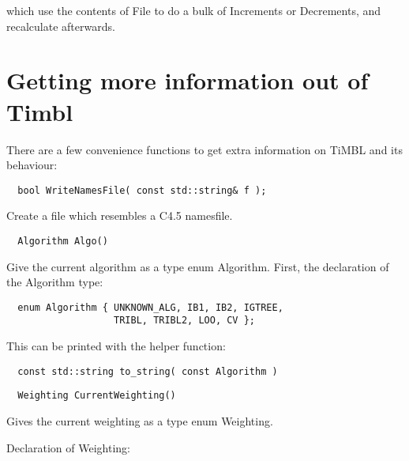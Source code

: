 \documentclass{report}
\begin{document}
which use the contents of File to do a bulk of Increments or Decrements, and
recalculate afterwards.

\section{Getting more information out of Timbl}

There are a few convenience functions to get extra information on
TiMBL and its behaviour:

\begin{footnotesize}
\begin{verbatim}
  bool WriteNamesFile( const std::string& f );
\end{verbatim}
\end{footnotesize}

Create a file which resembles a C4.5 namesfile.

\begin{footnotesize}
\begin{verbatim}
  Algorithm Algo()
\end{verbatim}
\end{footnotesize}

Give the current algorithm as a type enum Algorithm. First, the
declaration of the Algorithm type:

\begin{footnotesize}
\begin{verbatim}
  enum Algorithm { UNKNOWN_ALG, IB1, IB2, IGTREE, 
                   TRIBL, TRIBL2, LOO, CV };
\end{verbatim}
\end{footnotesize}

This can be printed with the helper function: 

\begin{footnotesize}
\begin{verbatim}
  const std::string to_string( const Algorithm )
\end{verbatim}
\end{footnotesize}

\begin{footnotesize}
\begin{verbatim}
  Weighting CurrentWeighting()
\end{verbatim}
\end{footnotesize}

Gives the current weighting as a type enum Weighting.

Declaration of Weighting:
\end{document}
